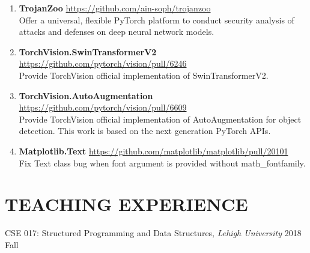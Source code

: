 \documentclass[letterpaper,11pt]{article}
\newcommand{\sociallink}[3]{\mbox{{#1}\hspace{0.5em}\href{#2}{#3}\hspace{1em}}}
\newcommand*{\website}[1]{\sociallink{\faGithub}{#1}{#1}}
\begin{document}
\begin{enumerate}[labelsep=15pt, parsep=4pt]

    \item \textbf{TrojanZoo} \hfill \website{https://github.com/ain-soph/trojanzoo}
    \vspace{0.3em}\\
    Offer a universal, flexible PyTorch platform to conduct security analysis of attacks and defenses on deep neural network models.
    
    \item \textbf{TorchVision.SwinTransformerV2} \hfill
    \website{https://github.com/pytorch/vision/pull/6246}
    \vspace{0.3em}\\
    Provide TorchVision official implementation of SwinTransformerV2.

    \item \textbf{TorchVision.AutoAugmentation} \hfill
    \website{https://github.com/pytorch/vision/pull/6609}
    \vspace{0.3em}\\
    Provide TorchVision official implementation of AutoAugmentation for object detection. This work is based on the next generation PyTorch APIs.

    \item \textbf{Matplotlib.Text} \hfill
    \website{https://github.com/matplotlib/matplotlib/pull/20101}
    \vspace{0.3em}\\
    Fix Text class bug when font argument is provided without math\_fontfamily.
    
    
\end{enumerate}

\section{TEACHING EXPERIENCE}
CSE 017: Structured Programming and Data Structures, \textit{Lehigh University}  \hfill 2018 Fall \vspace{3pt}\\
\end{document}
